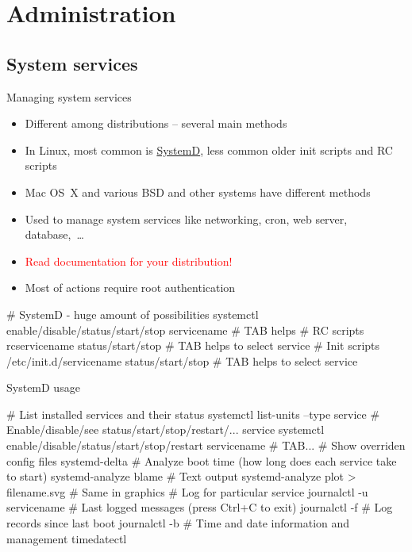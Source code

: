 \documentclass[compress, ucs, xelatex, 11pt, xcolor=svgnames,
  hyperref={
    bookmarks=true,
    unicode=true,
    colorlinks=true,
    pdftitle={Linux, command line and MetaCentrum},
    plainpages=false,
    pdfauthor={Vojtech Zeisek},
    pdfsubject={Course about use of Linux command line, writing shell scripts and using MetaCentrum of CESNET},
    pdfcreator={XeLaTeX},
    pdfkeywords={Linux, GNU, BASH, shell, command line, MetaCentrum},
    linkcolor=DarkRed,
    anchorcolor=DarkBlue,
    citecolor=Indigo,
    filecolor=NavyBlue,
    menucolor=DarkMagenta,
    urlcolor=DarkBlue,
    pdftex},
  url={hyphens, lowtilde} %
  ]{beamer}
\renewcommand{\alert}[1]{\textcolor{red}{#1}}
\begin{document}
\section{Administration}


\subsection{System services}

\begin{frame}[fragile]{Managing system services}
  \begin{itemize}
    \item Different among distributions -- several main methods
    \item In Linux, most common is \href{https://wiki.freedesktop.org/www/Software/systemd/}{SystemD}, less common older init scripts and RC scripts
    \item Mac OS~X and various BSD and other systems have different methods
    \item Used to manage system services like networking, cron, web server, database,~\ldots
    \item \alert{Read documentation for your distribution!}
    \item Most of actions require root authentication
  \end{itemize}
  \begin{bashcode}
    # SystemD - huge amount of possibilities
    systemctl enable/disable/status/start/stop servicename # TAB helps
    # RC scripts
    rcservicename status/start/stop # TAB helps to select service
    # Init scripts
    /etc/init.d/servicename status/start/stop # TAB helps to select service
  \end{bashcode}
\end{frame}

\begin{frame}[fragile]{SystemD usage}
  \begin{bashcode}
    # List installed services and their status
    systemctl list-units --type service
    # Enable/disable/see status/start/stop/restart/... service
    systemctl enable/disable/status/start/stop/restart servicename # TAB...
    # Show overriden config files
    systemd-delta
    # Analyze boot time (how long does each service take to start)
    systemd-analyze blame # Text output
    systemd-analyze plot > filename.svg # Same in graphics
    # Log for particular service
    journalctl -u servicename
    # Last logged messages (press Ctrl+C to exit)
    journalctl -f
    # Log records since last boot
    journalctl -b
    # Time and date information and management
    timedatectl
  \end{bashcode}
\end{frame}
\end{document}
